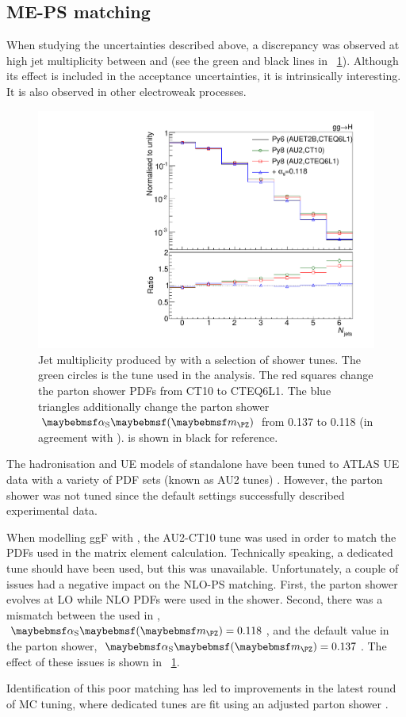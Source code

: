 \subsection{ME-PS matching}
\label{sec:ggF:meps_matching}

When studying the uncertainties described above, a discrepancy was observed at high jet 
multiplicity between  and  (see 
the green and black lines in \Figure~\ref{fig:signal:matching}). Although its effect is 
included in the acceptance uncertainties, it is intrinsically interesting. It is also 
observed in other electroweak processes.

\begin{figure}[t]
	\includegraphics[width=\smallfigwidth]{tex/signal/matching}
	\caption{Jet multiplicity produced by  with a selection 
	of shower tunes. The green circles is the tune used in the analysis. The red squares 
	change the parton shower PDFs from CT10 to CTEQ6L1. The blue triangles additionally 
	change the parton shower $\alphaS\parenths{\mZ}$ from 0.137 to 0.118 (in agreement 
	with \powhegbox).  is shown in black for reference.}
	\label{fig:signal:matching}
\end{figure}

The hadronisation and UE models of standalone  have been tuned to ATLAS 
UE data with a variety of PDF sets (known as AU2 tunes) \cite{ATLAS:tune:2012}.
However, the parton shower was not tuned since the default settings successfully described 
experimental data. 

When modelling ggF with \powhegbox, the AU2-CT10 tune was used in order to match the 
PDFs used in the matrix element calculation. Technically speaking, a dedicated 
 tune should have been used, but this was unavailable. 
Unfortunately, a couple of issues had a negative impact on the NLO-PS matching. First, 
the parton shower evolves \alphaS at LO while NLO PDFs were used in the shower. 
Second, there was a mismatch between the \alphaS used in \powhegbox, 
$\alphaS\parenths{\mZ} = 0.118$, and the default value in the parton shower, 
$\alphaS\parenths{\mZ} = 0.137$. The effect of these issues is shown in 
\Figure~\ref{fig:signal:matching}.

Identification of this poor matching has led to improvements in the latest round of MC 
tuning, where dedicated  tunes are fit using an adjusted 
parton shower \cite{ATLAS:tune:2013}.

